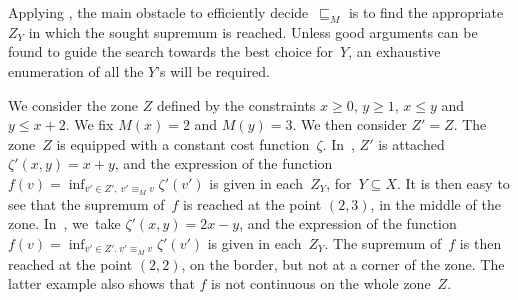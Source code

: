 Applying , the main obstacle to efficiently
decide~$\sqsubseteq_M$ is to find the appropriate $Z_Y$ in which the sought
supremum is reached. Unless good arguments can be found to guide the search
towards the best choice for~$Y$, an exhaustive enumeration of all the $Y$'s
will be required.

\begin{example}
  We consider the zone $Z$ defined by the constraints $x \geq 0$, $y
  \geq 1$, $x \leq y$ and $y \leq x+2$.  We fix $M(x) = 2$ and $M(y) =
  3$.  We then consider $Z' = Z$. The zone~$Z$ is equipped with a constant cost
  function~$\zeta$.
In~, $Z'$ is attached $\zeta'(x,y) = x + y$, and
  the  
  expression of the function 
$f(v) = \inf_{v' \in Z',\ v' \equiv_M v} \zeta'(v')$ 
  is given in each~$Z_Y$, for~$Y\subseteq X$.
  It is then easy to see that the supremum of~$f$ is reached at the
  point 
  $(2,3)$, in the middle of the zone.  In~,
  we~take $\zeta'(x,y) = 2x - y$, and the expression of the function
  $f(v) = \inf_{v' \in Z'.\ v' \equiv_M v} \zeta'(v')$ is given in
  each~$Z_Y$.  The supremum of~$f$ is then reached at the point 
  $(2,2)$, on the border, but not at a corner of the zone.  The latter
  example also shows that $f$ is not continuous on the whole zone~$Z$.
\end{example}

